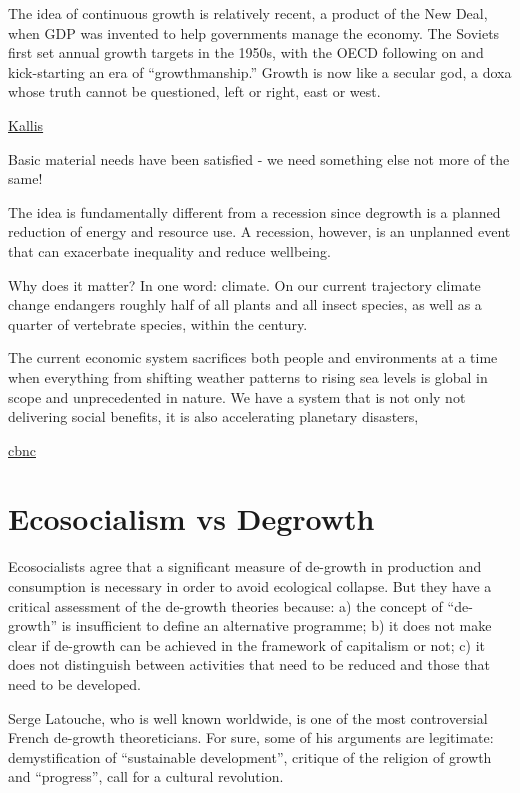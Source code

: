 \documentclass[
]{book}
\begin{document}
The idea of continuous growth is relatively recent, a product of the New Deal, when GDP was invented to help governments manage the economy. The Soviets first set annual growth targets in the 1950s, with the OECD following on and kick-starting an era of ``growthmanship.'' Growth is now like a secular god, a doxa whose truth cannot be questioned, left or right, east or west.

\href{https://www.cato-unbound.org/2021/04/14/giorgos-kallis/why-malthuss-gospel-growth-was-still-wrong}{Kallis}

Basic material needs have been satisfied - we need something else not more of the same!

The idea is fundamentally different from a recession since
degrowth is a planned reduction of energy and resource use.
A recession, however, is an unplanned event that can exacerbate inequality and reduce wellbeing.

Why does it matter?
In one word: climate.
On our current trajectory climate change endangers roughly half of all plants and all insect species,
as well as a quarter of vertebrate species, within the century.

The current economic system sacrifices both people and environments at a time when everything from shifting weather patterns to rising sea levels is global in scope and unprecedented in nature.
We have a system that is not only not delivering social benefits, it is also accelerating planetary disasters,

\href{https://www.cnbc.com/amp/2021/02/19/degrowth-pushing-social-wellbeing-and-climate-over-economic-growth.html}{cbnc}

\hypertarget{ecosocialism-vs-degrowth}{%
\section{Ecosocialism vs Degrowth}\label{ecosocialism-vs-degrowth}}

Ecosocialists agree that a significant measure of de-growth in production and consumption is necessary in order to avoid ecological collapse. But they have a critical assessment of the de-growth theories because: a) the concept of ``de-growth'' is insufficient to define an alternative programme; b) it does not make clear if de-growth can be achieved in the framework of capitalism or not; c) it does not distinguish between activities that need to be reduced and those that need to be developed.

Serge Latouche, who is well known worldwide, is one of the most controversial French de-growth theoreticians. For sure, some of his arguments are legitimate: demystification of ``sustainable development'', critique of the religion of growth and ``progress'', call for a cultural revolution.
\end{document}
